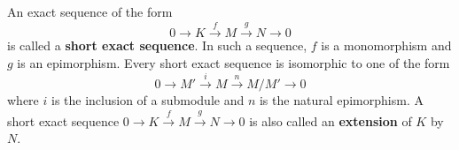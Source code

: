 An exact sequence of the form
$$0 \to K \xrightarrow{f} M \xrightarrow{g} N \to 0$$
is called a \textbf{short exact sequence}. In such a sequence, $f$ is a monomorphism and $g$ is an epimorphism. Every short exact sequence is isomorphic to one of the form
$$0 \to M' \xrightarrow{i} M \xrightarrow{n} M/M' \to 0$$
where $i$ is the inclusion of a submodule and $n$ is the natural epimorphism. A short exact sequence $0 \to K \xrightarrow{f} M \xrightarrow{g} N \to 0$ is also called an \textbf{extension} of $K$ by $N$.
